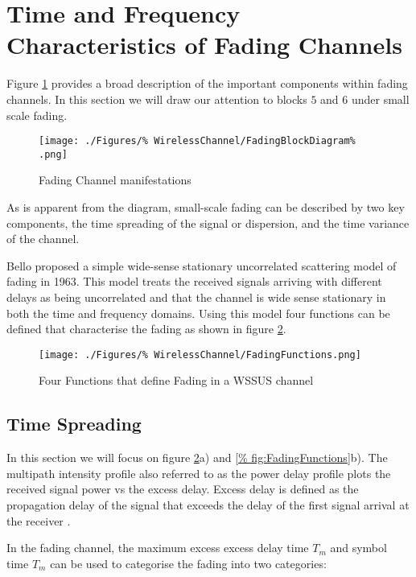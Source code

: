 \section{Time and Frequency Characteristics of Fading %
Channels}
\FloatBarrier

Figure \ref{fig:FadingBlocks} provides a broad %
description of the important components within %
fading channels. In this section we will draw our %
attention to blocks $5$ and $6$ under small %
scale fading.

\begin{figure}[ht]
	\texttt{[image: ./Figures/\%
		WirelessChannel/FadingBlockDiagram\%
		.png]}
	\caption{Fading Channel manifestations%
		\cite{Sklar97-1}}
	\label{fig:FadingBlocks}
\end{figure}

As is apparent from the diagram, small-scale fading %
can be described by two key components, the time %
spreading of the signal or dispersion, and the time %
variance of the channel. 

Bello \cite{Bello63} proposed a simple wide-sense %
stationary uncorrelated scattering model of fading in %
1963. This model treats the received signals arriving %
with different delays as being uncorrelated and that %
the channel is wide sense stationary in both the time %
and frequency domains. Using this model four functions %
can be defined that characterise the fading as shown in %
figure \ref{fig:FadingFunctions}.

\begin{figure}[ht]
	\texttt{[image: ./Figures/\%
		WirelessChannel/FadingFunctions.png]}
	\caption{Four Functions that define Fading in %
			a WSSUS channel \cite{Sklar01}}
	\label{fig:FadingFunctions}
\end{figure}

\FloatBarrier
\subsection{Time Spreading}
In this section we will focus on figure %
\ref{fig:FadingFunctions}a) and \ref{%
fig:FadingFunctions}b). The multipath %
intensity profile also referred to as the %
power delay profile plots the received %
signal power vs the excess delay. %
Excess delay is defined as the propagation %
delay of the signal that exceeds the delay %
of the first signal arrival at the receiver %
\cite{Sklar01}.

In the fading channel, the maximum excess %
excess delay time $T_{m}$ and symbol time %
$T_{m}$ can be used to categorise the %
fading into two categories:

